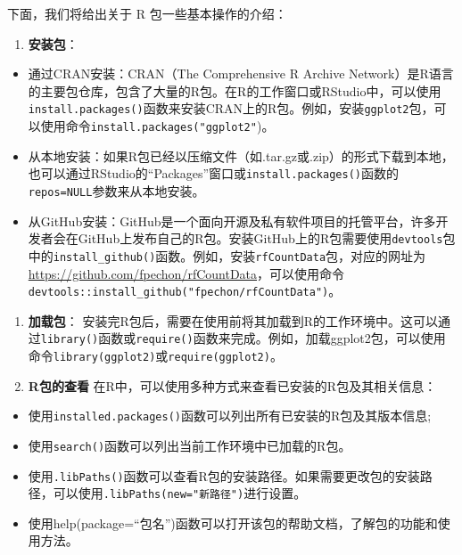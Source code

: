 \documentclass[
]{book}
\providecommand{\tightlist}{%
  \setlength{\itemsep}{0pt}\setlength{\parskip}{0pt}}
\begin{document}
下面，我们将给出关于 R 包一些基本操作的介绍：

\begin{enumerate}
\def\labelenumi{\arabic{enumi}.}
\tightlist
\item
  \textbf{安装包}：
\end{enumerate}

\begin{itemize}
\item
  通过CRAN安装：CRAN（The Comprehensive R Archive Network）是R语言的主要包仓库，包含了大量的R包。在R的工作窗口或RStudio中，可以使用\texttt{install.packages()}函数来安装CRAN上的R包。例如，安装\texttt{ggplot2}包，可以使用命令\texttt{install.packages("ggplot2"})。
\item
  从本地安装：如果R包已经以压缩文件（如.tar.gz或.zip）的形式下载到本地，也可以通过RStudio的``Packages''窗口或\texttt{install.packages()}函数的\texttt{repos=NULL}参数来从本地安装。
\item
  从GitHub安装：GitHub是一个面向开源及私有软件项目的托管平台，许多开发者会在GitHub上发布自己的R包。安装GitHub上的R包需要使用\texttt{devtools}包中的\texttt{install\_github()}函数。例如，安装\texttt{rfCountData}包，对应的网址为\url{https://github.com/fpechon/rfCountData}，可以使用命令\texttt{devtools::install\_github("fpechon/rfCountData")}。
\end{itemize}

\begin{enumerate}
\def\labelenumi{\arabic{enumi}.}
\setcounter{enumi}{1}
\item
  \textbf{加载包}：
  安装完R包后，需要在使用前将其加载到R的工作环境中。这可以通过\texttt{library()}函数或\texttt{require()}函数来完成。例如，加载ggplot2包，可以使用命令\texttt{library(ggplot2)}或\texttt{require(ggplot2)}。
\item
  \textbf{R包的查看}
  在R中，可以使用多种方式来查看已安装的R包及其相关信息：
\end{enumerate}

\begin{itemize}
\tightlist
\item
  使用\texttt{installed.packages()}函数可以列出所有已安装的R包及其版本信息;
\item
  使用\texttt{search()}函数可以列出当前工作环境中已加载的R包。
\item
  使用\texttt{.libPaths()}函数可以查看R包的安装路径。如果需要更改包的安装路径，可以使用\texttt{.libPaths(new="新路径")}进行设置。
\item
  使用help(package=``包名'')函数可以打开该包的帮助文档，了解包的功能和使用方法。
\end{itemize}
\end{document}
